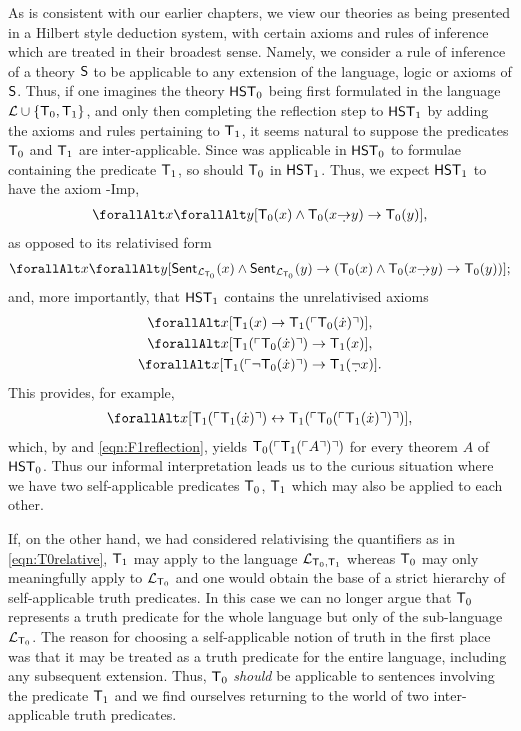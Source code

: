 \documentclass[UKenglish,cleveref,DIV=12]{scrartcl}
\let\forall\forallAlt
\theoremstyle{definition}
\theoremstyle{definition}
\begin{document}
As is consistent with our earlier chapters, we view our theories as being
presented in a Hilbert style deduction system, with certain axioms and rules of inference which
are treated in their broadest sense. Namely, we consider a rule of inference of a
theory $\mathsf{S}$ to be applicable to any extension of the language, logic or
axioms of $\mathsf{S}$. Thus, if one imagines the theory $\mathsf{HST}_0$ being first
formulated in the language $\mathcal{L}\cup\{\mathsf{T}_0,\mathsf{T}_1\}$, and only then completing
the reflection step to $\mathsf{HST}_1$ by adding the axioms and rules pertaining to
$\mathsf{T}_1$, it seems natural to suppose the predicates $\mathsf{T}_0$ and $\mathsf{T}_1$ are
inter-applicable. Since  was applicable in $\mathsf{HST}_0$ to formulae
containing the predicate $\mathsf{T}_1$, so should $\mathsf{T}_0$ in $\mathsf{HST}_1$. Thus, we expect
$\mathsf{HST}_1$ to have the axiom -Imp,
\begin{align*}
  \forall x\forall y[ \T_0(x)\land \T_0(x\dimplies y)\rightarrow \T_0(y)],
\end{align*}
as opposed to its relativised form
\begin{align}\label{eqn:T0relative}
  \forall x\forall y[\Sent_{\L_{\T_0}}(x)\land\Sent_{\L_{\T_0}}(y)\rightarrow ( \T_0(x)\land \T_0(x\dimplies y)\rightarrow \T_0(y))];
\end{align}
and, more importantly, that $\mathsf{HST}_1$ contains the unrelativised axioms
\begin{gather}
  \forall x[\T_1(x)\rightarrow \T_1(\gn{\T_0(\dot x)})],\nonumber\\
  \forall x[\T_1(\gn{\T_0(\dot x)})\rightarrow \T_1(x)],\label{eqn:F1ax1}\\
  \forall x[\T_1(\gn{\lnot \T_0(\dot x)})\rightarrow \T_1(\dlnot x)].\nonumber
\end{gather}
This provides, for example,
\begin{align*}
  \forall x[\T_1(\gn{\T_1(\dot x)})\equi \T_1(\gn{\T_0(\gn{\T_1(\dot x)})})],
\end{align*}
which, by  and \cref{eqn:F1reflection}, yields
$\mathsf{T}_0(\ulcorner{\mathsf{T}_1(\ulcorner{A}\urcorner)}\urcorner)$ for every theorem $A$ of $\mathsf{HST}_0$. Thus our informal
interpretation leads us to the curious situation where we have two
self-applicable predicates $\mathsf{T}_0$, $\mathsf{T}_1$ which may also be applied to each other.

If, on the other hand, we had considered relativising the quantifiers as in \cref{eqn:T0relative},
$\mathsf{T}_1$ may apply to the language $\mathcal{L}_{\mathsf{T}_0,\mathsf{T}_1}$ whereas $\mathsf{T}_0$ may only
meaningfully apply to $\mathcal{L}_{\mathsf{T}_0}$ and one would obtain the base of a strict
hierarchy of self-applicable truth predicates. In this case we can no longer
argue that $\mathsf{T}_0$ represents a truth predicate for the whole language but only of
the sub-language $\mathcal{L}_{\mathsf{T}_0}$. The reason for choosing a self-applicable
notion of truth in the first place was that it may be treated as a truth
predicate for the entire language, including any subsequent extension. Thus,
$\mathsf{T}_0$ {\em should} be applicable to sentences involving the predicate $\mathsf{T}_1$ and
we find ourselves returning to the world of two inter-applicable truth
predicates.
\end{document}
